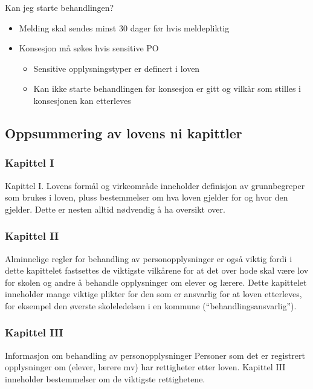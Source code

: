 \documentclass[11pt]{article}
\begin{document}
    Kan jeg starte behandlingen?
\begin{itemize}
\item Melding skal sendes minst 30 dager før hvis meldepliktig
\item Konsesjon må søkes hvis sensitive PO

\begin{itemize}
\item Sensitive opplysningstyper er definert i loven
\item Kan ikke starte behandlingen før konsesjon er gitt og vilkår
        som stilles i konsesjonen kan etterleves
\end{itemize}

\end{itemize}
\subsection{Oppsummering av lovens ni kapittler}
\label{sec-18.2}
\subsubsection{Kapittel I}
\label{sec-18.2.1}

    Kapittel I. Lovens formål og virkeområde inneholder definisjon av grunnbegreper 
    som brukes i loven, pluss bestemmelser om hva loven gjelder for og hvor den gjelder. 
    Dette er nesten alltid nødvendig å ha oversikt over.
\subsubsection{Kapittel II}
\label{sec-18.2.2}

    Alminnelige regler for behandling av personopplysninger er også viktig fordi
    i dette kapittelet fastsettes de viktigste vilkårene for at det over hode
    skal være lov for skolen og andre å behandle opplysninger om elever og lærere.
    Dette kapittelet inneholder mange viktige plikter for den som er ansvarlig for
    at loven etterleves, for eksempel den øverste skoleledelsen i en kommune 
    (``behandlingsansvarlig'').
\subsubsection{Kapittel III}
\label{sec-18.2.3}

    Informasjon om behandling av personopplysninger
    Personer som det er registrert opplysninger om (elever, lærere mv) har rettigheter
    etter loven. Kapittel III inneholder bestemmelser om de viktigste rettighetene.
\end{document}
